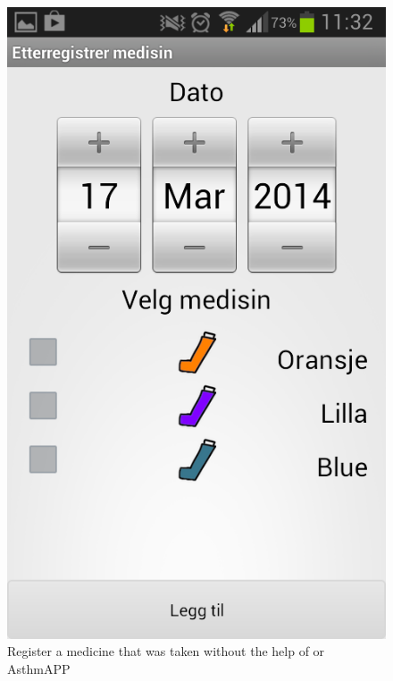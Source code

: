 \begin{figure}
\begin{minipage}[t]{0.4\linewidth}
			\includegraphics[width=0.20\paperwidth]{Pictures/new-screenshots/register-medicine-taken.png}
		\caption{Register a medicine that was taken without the help of \buddy{} or AsthmAPP}
		\label{fig:register_medicine_taken}
	\end{minipage}
		\begin{minipage}[t]{0.4\linewidth}
		\centering

\end{minipage}
\end{figure}
